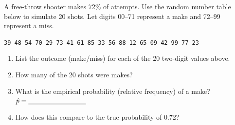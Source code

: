 \documentclass[10pt]{article}
\begin{document}
\vspace{0.1in}

\begin{practicebox}
\small
A free-throw shooter makes 72\% of attempts. Use the random number table
below to simulate 20 shots. Let digits 00--71 represent a make and 72--99
represent a miss.

\vspace{6pt}
{\small\texttt{39 48 54 70 29 73 41 61 85 33  56 88 12 65 09 42 99 77 23}}

\vspace{8pt}
\begin{enumerate}[leftmargin=1.5em, itemsep=8pt]
  \item List the outcome (make/miss) for each of the 20 two-digit values above.
        \vspace{20pt}
  \item How many of the 20 shots were makes? \blank{2cm}
  \item What is the empirical probability (relative frequency) of a make?
        $\hat{p} = \blank{3cm}$
  \item How does this compare to the true probability of 0.72?
        \writeline
\end{enumerate}
\end{practicebox}
\end{document}
